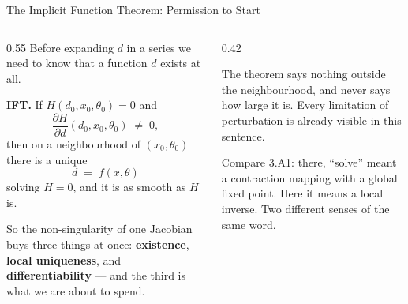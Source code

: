 \begin{frame}{The Implicit Function Theorem: Permission to Start}
\begin{columns}[T]
\begin{column}{0.55\textwidth}
\small
Before expanding $d$ in a series we need to know that a function $d$ exists at all.
\medskip

\textbf{IFT.} If $H(d_0,x_0,\theta_0)=0$ and
\[
  \frac{\partial H}{\partial d}(d_0,x_0,\theta_0)\;\neq\;0 ,
\]
then on a neighbourhood of $(x_0,\theta_0)$ there is a unique
\[
  d \;=\; f(x,\theta)
\]
solving $H=0$, and it is as smooth as $H$ is.
\medskip

So the non-singularity of one Jacobian buys three things at once: \textbf{existence}, \textbf{local uniqueness}, and \textbf{differentiability} --- and the third is what we are about to spend.
\end{column}
\begin{column}{0.42\textwidth}
\begin{conceptbox}[title=\textbf{Local, and only local}]\small
The theorem says nothing outside the neighbourhood, and never says how large it is. Every limitation of perturbation is already visible in this sentence.
\end{conceptbox}
\medskip
\begin{examplebox}\footnotesize
Compare 3.A1: there, ``solve'' meant a contraction mapping with a global fixed point. Here it means a local inverse. Two different senses of the same word.
\end{examplebox}
\end{column}
\end{columns}
\vspace{1mm}
\end{frame}

